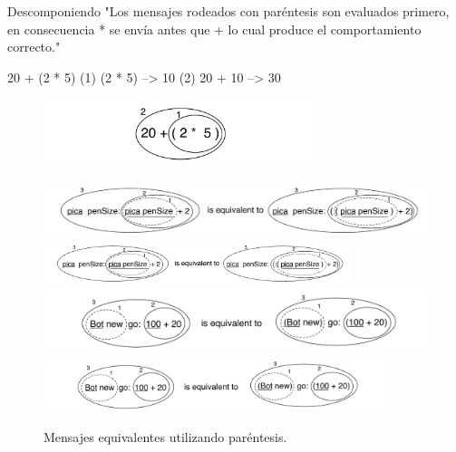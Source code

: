 \documentclass[a4paper,10pt,twoside]{book}
\begin{document}
\begin{example}[mathcorrect]{Descomponiendo }{}
"Los mensajes rodeados con paréntesis son evaluados primero, en consecuencia * se envía antes que + lo cual produce el comportamiento correcto."

    20 + (2 * 5) 
(1)        (2 * 5) --> 10
(2) 20 + 10      --> 30
\end{example}

\begin{figure}
\begin{center}
\includegraphics[width=8cm]{ucompoNumberBracket}
\end{center}
\end{figure}



\begin{figure}
\begin{center}
\ifluluelse
	{\includegraphics[width=\textwidth]{uKeyUnBinPar}}
	{\includegraphics[width=0.8\textwidth]{uKeyUnBinPar}}
\ifluluelse
	{\includegraphics[width=\textwidth]{uunKeyBinPar}}
	{\includegraphics[width=10cm]{uunKeyBinPar}}
\end{center}
\caption{Mensajes equivalentes utilizando paréntesis. }
\end{figure}
\end{document}
